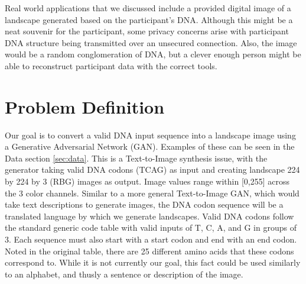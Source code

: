 \documentclass{article}
\begin{document}
	Real world applications that we discussed include a provided digital image of a landscape generated based on the participant’s DNA. Although this might be a neat souvenir for the participant, some privacy concerns arise with participant DNA structure being transmitted over an unsecured connection. Also, the image would be a random conglomeration of DNA, but a clever enough person might be able to reconstruct participant data with the correct tools. 
	
	
	\section{Problem Definition}
	\label{sec:problemdef}
	Our goal is to convert a valid DNA input sequence into a landscape image using a Generative Adversarial Network (GAN). Examples of these can be seen in the Data section \ref{sec:data}. This is a Text-to-Image synthesis issue, with the generator taking valid DNA codons (TCAG) as input and creating landscape 224 by 224 by 3 (RBG) images as output. Image values range within [0,255] across the 3 color channels. Similar to a more general Text-to-Image GAN, which would take text descriptions to generate images, the DNA codon sequence will be a translated language by which we generate landscapes. Valid DNA codons follow the standard generic code table with valid inputs of T, C, A, and G in groups of 3. Each sequence must also start with a start codon and end with an end codon. Noted in the original table, there are 25 different amino acids that these codons correspond to. While it is not currently our goal, this fact could be used similarly to an alphabet, and thusly a sentence or description of the image.  
\end{document}
